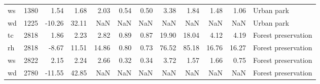 \begin{table}
\begin{tabular}{lrrrrrrrrrrl}
ws &   1380 &   1.54 &   1.68 &   2.03 &  0.54 &  0.50 &   3.38 &   1.84 &   1.48 &   1.06 &           Urban park \\
wd &   1225 & -10.26 &  32.11 &    NaN &   NaN &   NaN &    NaN &    NaN &    NaN &    NaN &           Urban park \\
tc &   2818 &   1.86 &   2.23 &   2.82 &  0.89 &  0.87 &  19.90 &  18.04 &   4.12 &   4.19 &  Forest preservation \\
rh &   2818 &  -8.67 &  11.51 &  14.86 &  0.80 &  0.73 &  76.52 &  85.18 &  16.76 &  16.27 &  Forest preservation \\
ws &   2822 &   2.15 &   2.24 &   2.66 &  0.32 &  0.34 &   3.72 &   1.57 &   1.66 &   0.75 &  Forest preservation \\
wd &   2780 & -11.55 &  42.85 &    NaN &   NaN &   NaN &    NaN &    NaN &    NaN &    NaN &  Forest preservation \\
\bottomrule
\end{tabular}
\end{table}

